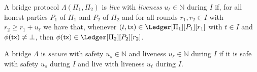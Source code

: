 \begin{definition}\label{def:bridge-liveness}
  A bridge protocol $\Lambda(\Pi_1, \Pi_2)$ is \emph{live} with \emph{liveness} $u_\ell \in \mathbb{N}$
  during $I$ if, for all honest parties $P_1$ of $\Pi_1$ and $P_2$ of $\Pi_2$ and for all rounds
  $r_1, r_2 \in I$ with $r_2 \geq r_1 + u_\ell$ we have that, whenever $(t, \tx) \in \Ledger[\Pi_1][P_1][r_1]$
  with $t \in I$ and $\phi(\textsf{tx}) \neq \bot$, then $\phi(\tx) \in \Ledger[\Pi_2][P_2][r_2]$.
\end{definition}

\begin{definition}\label{def:bridge-security}
  A bridge $\Lambda$ is \emph{secure} with safety $u_s \in \mathbb{N}$ and
  liveness $u_\ell \in \mathbb{N}$ during $I$ if it is safe with safety $u_s$ during $I$
  and live with liveness $u_\ell$ during $I$.
\end{definition}

